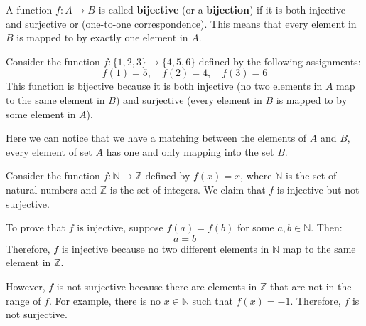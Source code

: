 \documentclass[11pt]{article}
\begin{document}
\begin{definition}
    A function $f: A \to B$ is called \textbf{bijective} (or a \textbf{bijection}) if it is both injective and surjective or (one-to-one correspondence). This means that every element in $B$ is mapped to by exactly one element in $A$.
\end{definition}
\begin{example}
    Consider the function $f: \{1, 2, 3\} \to \{4, 5, 6\}$ defined by the following assignments:
    \[
        f(1) = 5, \quad f(2) = 4, \quad f(3) = 6
    \]
    This function is bijective because it is both injective (no two elements in $A$
    map to the same element in $B$) and surjective (every element in $B$ is mapped
    to by some element in $A$).
\end{example}
Here we can notice that we have a matching between the elements of $A$ and $B$, every element of set $A$ has one and only mapping into the set $B$.

\begin{example}
    Consider the function $f: \mathbb{N} \to \mathbb{Z}$ defined by $f(x) = x$, where $\mathbb{N}$ is the set of natural numbers and $\mathbb{Z}$ is the set of integers. We claim that $f$ is injective but not surjective.

    To prove that $f$ is injective, suppose $f(a) = f(b)$ for some $a, b \in \mathbb{N}$. Then:
    \[
        a = b
    \]
    Therefore, $f$ is injective because no two different elements in $\mathbb{N}$ map to the same element in $\mathbb{Z}$.

    However, $f$ is not surjective because there are elements in $\mathbb{Z}$ that are not in the range of $f$. For example, there is no $x \in \mathbb{N}$ such that $f(x) = -1$. Therefore, $f$ is not surjective.
\end{example}
\end{document}

